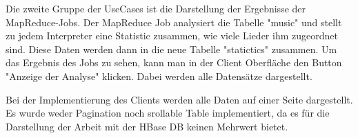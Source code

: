 Die zweite Gruppe der UseCases ist die Darstellung der Ergebnisse der MapReduce-Jobs.
Der MapReduce Job analysiert die Tabelle "music" und stellt zu jedem Interpreter eine Statistic zusammen, wie viele Lieder ihm zugeordnet sind. Diese Daten werden dann in die neue Tabelle "statictics" zusammen. Um das Ergebnis des Jobs zu sehen, kann man in der Client Oberfläche den Button "Anzeige der Analyse" klicken. Dabei werden alle Datensätze dargestellt.

Bei der Implementierung des Clients werden alle Daten auf einer Seite dargestellt. Es wurde weder  Pagination noch srollable Table implementiert, da es für die Darstellung der Arbeit mit der HBase DB keinen Mehrwert bietet.


